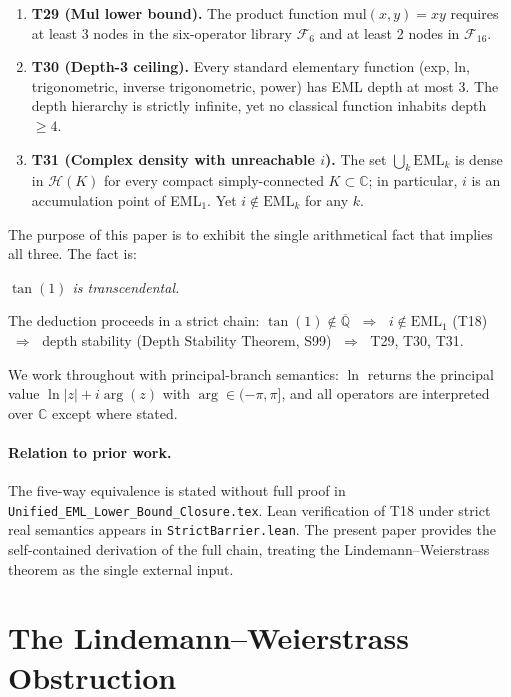 \documentclass[11pt]{article}
\begin{document}
\begin{enumerate}
\item \textbf{T29 (Mul lower bound).}  The product function $\mathrm{mul}(x,y) = xy$
      requires at least 3 nodes in the six-operator library $\mathcal{F}_6$ and at
      least 2 nodes in $\mathcal{F}_{16}$.

\item \textbf{T30 (Depth-3 ceiling).}  Every standard elementary function
      (exp, ln, trigonometric, inverse trigonometric, power) has EML depth at most 3.
      The depth hierarchy is strictly infinite, yet no classical function inhabits
      depth $\geq 4$.

\item \textbf{T31 (Complex density with unreachable $i$).}
      The set $\bigcup_k \mathrm{EML}_k$ is dense in $\mathcal{H}(K)$ for every compact
      simply-connected $K \subset \mathbb{C}$; in particular, $i$ is an accumulation
      point of EML$_1$.  Yet $i \notin \mathrm{EML}_k$ for any $k$.
\end{enumerate}

The purpose of this paper is to exhibit the single arithmetical fact that implies
all three.  The fact is:

\begin{center}
\textit{$\tan(1)$ is transcendental.}
\end{center}

The deduction proceeds in a strict chain:
$\tan(1) \notin \overline{\mathbb{Q}}$
$\;\Rightarrow\;$ $i \notin \mathrm{EML}_1$ (T18)
$\;\Rightarrow\;$ depth stability (Depth Stability Theorem, S99)
$\;\Rightarrow\;$ T29, T30, T31.

We work throughout with principal-branch semantics: $\ln$ returns the principal
value $\ln|z| + i\arg(z)$ with $\arg \in (-\pi, \pi]$, and all operators are
interpreted over $\mathbb{C}$ except where stated.

\paragraph{Relation to prior work.}
The five-way equivalence is stated without full proof in
\texttt{Unified\_EML\_Lower\_Bound\_Closure.tex}.
Lean verification of T18 under strict real semantics appears in
\texttt{StrictBarrier.lean}.
The present paper provides the self-contained derivation of the full chain,
treating the Lindemann--Weierstrass theorem as the single external input.

\section{The Lindemann--Weierstrass Obstruction}
\end{document}
